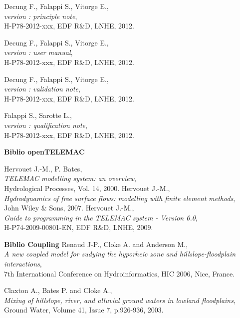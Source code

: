 
\pagebreak


\begin{thebibliography}{99}

  {\sc Decung F., Falappi S., Vitorge E.},\\
 {\em \estel version \rel: principle note},\\
H-P78-2012-xxx, EDF R\&D, LNHE, 2012.

  {\sc Decung F., Falappi S., Vitorge E.},\\
 {\em \estel version \rel: user manual},\\
H-P78-2012-xxx, EDF R\&D, LNHE, 2012.

  {\sc Decung F., Falappi S., Vitorge E.},\\
 {\em \estel version \rel: validation note},\\
H-P78-2012-xxx, EDF R\&D, LNHE, 2012.

  {\sc Falappi S., Sarotte L.},\\
 {\em \estel version \rel: qualification note},\\
H-P78-2012-xxx, EDF R\&D, LNHE, 2012.

\vspace{0.5cm}
{\bf Biblio openTELEMAC}

  {\sc Hervouet J.-M., P. Bates},\\
 {\em TELEMAC modelling system: an overview},\\
Hydrological Processes, Vol. 14, 2000.
% 
  {\sc Hervouet J.-M.},\\
 {\em Hydrodynamics of free surface flows: modelling with finite element methods},\\
John Wiley \& Sons, 2007.
% 
  {\sc Hervouet J.-M.},\\
 {\em Guide to programming in the TELEMAC system - Version 6.0},\\
H-P74-2009-00801-EN, EDF R\&D, LNHE, 2009.

\vspace{0.5cm} {\bf Biblio Coupling}
% 
  {\sc Renaud J-P., Cloke A. and Anderson M.},\\
 {\em A new coupled model for sudying the hyporheic zone and hillslope-floodplain interactions},\\
7th International Conference on Hydroinformatics, HIC 2006, Nice, France.

  {\sc Claxton A., Bates P. and Cloke A.},\\
 {\em Mixing of hillslope, river, and alluvial ground waters in lowland floodplains},\\
Ground Water, Volume 41, Issue 7, p.926-936, 2003.

% 
\end{thebibliography}
